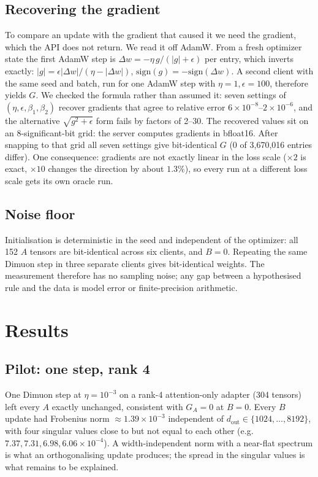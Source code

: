 \documentclass[11pt]{article}
\begin{document}
\subsection{Recovering the gradient}\label{sec:oracle}
To compare an update with the gradient that caused it we need the gradient, which the API does
not return. We read it off AdamW. From a fresh optimizer state the first AdamW step is
$\Delta w=-\eta\,g/(|g|+\epsilon)$ per entry, which inverts exactly:
$|g|=\epsilon|\Delta w|/(\eta-|\Delta w|)$, $\mathrm{sign}(g)=-\mathrm{sign}(\Delta w)$. A second
client with the same seed and batch, run for one AdamW step with $\eta=1,\epsilon=100$, therefore
yields $G$. We checked the formula rather than assumed it: seven settings of
$(\eta,\epsilon,\beta_1,\beta_2)$ recover gradients that agree to relative error
$6\times10^{-8}$--$2\times10^{-6}$, and the alternative $\sqrt{g^2+\epsilon}$ form fails by factors
of 2--30. The recovered values sit on an 8-significant-bit grid: the server computes gradients in
bfloat16. After snapping to that grid all seven settings give bit-identical $G$
(0 of 3{,}670{,}016 entries differ). One consequence: gradients are not exactly linear in the loss
scale ($\times 2$ is exact, $\times 10$ changes the direction by about $1.3\%$), so every run at a
different loss scale gets its own oracle run.

\subsection{Noise floor}
Initialisation is deterministic in the seed and independent of the optimizer: all 152 $A$
tensors are bit-identical across six clients, and $B=0$. Repeating the same Dimuon step in three
separate clients gives bit-identical weights. The measurement therefore has no sampling noise;
any gap between a hypothesised rule and the data is model error or finite-precision arithmetic.

\section{Results}
\subsection{Pilot: one step, rank 4}
One Dimuon step at $\eta=10^{-3}$ on a rank-4 attention-only adapter (304 tensors) left every
$A$ exactly unchanged, consistent with $G_A=0$ at $B=0$. Every $B$ update had Frobenius norm
$\approx 1.39\times10^{-3}$ independent of $d_\text{out}\in\{1024,\dots,8192\}$, with four singular
values close to but not equal to each other (e.g.\ $7.37,7.31,6.98,6.06\times10^{-4}$). A
width-independent norm with a near-flat spectrum is what an orthogonalising update produces; the
spread in the singular values is what remains to be explained.
\end{document}
